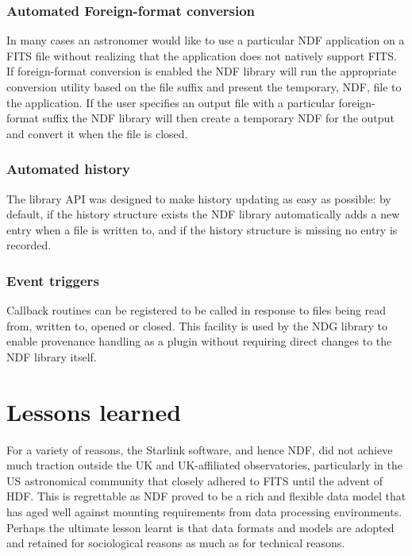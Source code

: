 \documentclass[final,authoryear,5p,times,twocolumn]{elsarticle}
\begin{document}
\subsubsection{Automated Foreign-format conversion}

In many cases an astronomer would like to use a particular NDF
application on a FITS file without realizing that the application does
not natively support FITS. If foreign-format conversion is enabled the
NDF library will run the appropriate conversion utility based on the
file suffix and present the temporary, NDF, file to the application. If the
user specifies an output file with a particular foreign-format suffix
the NDF library will then create a temporary NDF for the output and convert
it when the file is closed.

\subsubsection{Automated history}

The library API was designed to make history updating as easy
as possible: by default, if the history structure exists the NDF
library automatically adds a new entry when a file is written
to, and if the history structure is missing no entry is recorded.

\subsubsection{Event triggers}

Callback routines can be registered to be called in response to files
being read from, written to, opened or closed. This facility is used
by the NDG library \citep{SUN2} to enable provenance handling
as a plugin without requiring direct changes to the NDF library itself.

\section{Lessons learned}
\label{sec:lessons}

For a variety of reasons, the Starlink software, and hence NDF,
did not achieve much traction outside the UK and UK-affiliated
observatories, particularly in
the US astronomical community that closely adhered to FITS until the
advent of HDF. This is regrettable as NDF proved to be a rich and
flexible data model that has aged well against mounting requirements
from data processing environments. Perhaps the ultimate lesson learnt
is that data formats and models are adopted and retained for sociological reasons
as much as for technical reasons.
\end{document}
